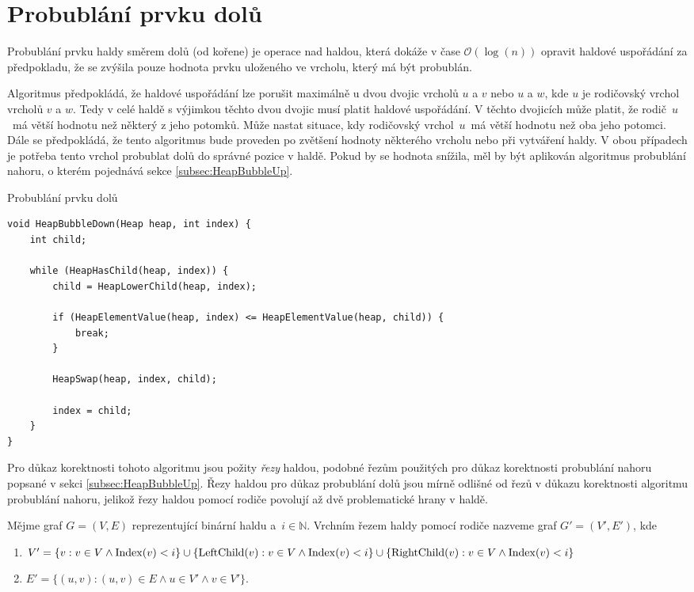 \section{Probublání prvku dolů}
\label{subsec:HeapBubbleDown}

Probublání prvku haldy směrem dolů (od kořene) je operace nad haldou, která dokáže v čase $\mathcal{O}(\log(n))$ opravit haldové uspořádání za předpokladu, že se zvýšila pouze hodnota prvku uloženého ve vrcholu, který má být probublán.

Algoritmus předpokládá, že haldové uspořádání lze porušit maximálně u dvou dvojic vrcholů $u$ a $v$ nebo $u$ a $w$, kde $u$ je rodičovský vrchol vrcholů $v$ a $w$. Tedy v celé haldě s výjimkou těchto dvou dvojic musí platit haldové uspořádání. V těchto dvojicích může platit, že rodič~$u$~má větší hodnotu než některý z jeho potomků. Může nastat situace, kdy rodičovský vrchol~$u$~má větší hodnotu než oba jeho potomci. Dále se předpokládá, že tento algoritmus bude proveden po zvětšení hodnoty některého vrcholu nebo při vytváření haldy. V obou případech je potřeba tento vrchol probublat dolů do správné pozice v haldě. Pokud by se hodnota snížila, měl by být aplikován algoritmus probublání nahoru, o kterém pojednává sekce \ref{subsec:HeapBubbleUp}.


\begin{listing}[H]
	\caption{Probublání prvku dolů}
	\label{list:HeapBubbleDown}
	\begin{verbatim}
void HeapBubbleDown(Heap heap, int index) {
    int child;

    while (HeapHasChild(heap, index)) {
        child = HeapLowerChild(heap, index);

        if (HeapElementValue(heap, index) <= HeapElementValue(heap, child)) {
            break;
        }

        HeapSwap(heap, index, child);

        index = child;
    }
}
	\end{verbatim}
\end{listing}

Pro důkaz korektnosti tohoto algoritmu jsou požity \textit{řezy} haldou, podobné řezům použitých pro důkaz korektnosti probublání nahoru popsané v sekci \ref{subsec:HeapBubbleUp}. Řezy haldou pro důkaz probublání dolů jsou mírně odlišné od řezů v důkazu korektnosti algoritmu probublání nahoru, jelikož řezy haldou pomocí rodiče povolují až dvě problematické hrany v haldě.

\begin{definition}
	Mějme graf $G = (V, E)$ reprezentující binární haldu a~$i \in \mathbb{N}$.
	Vrchním řezem haldy pomocí rodiče nazveme graf $G' = (V', E')$, kde
	\begin{enumerate}
	  \item[] $V' = \{ v: v \in V \land \operatorname{Index}(v) < i \} \cup \{ \operatorname{LeftChild}(v): v \in V \land \operatorname{Index}(v) < i \} \cup \{ \operatorname{RightChild}(v): v \in V \land \operatorname{Index}(v) < i \}$
	  \item[] $E' = \{ (u, v): (u, v) \in E \land u \in V' \land v \in V' \}$.
	\end{enumerate}
\end{definition}

